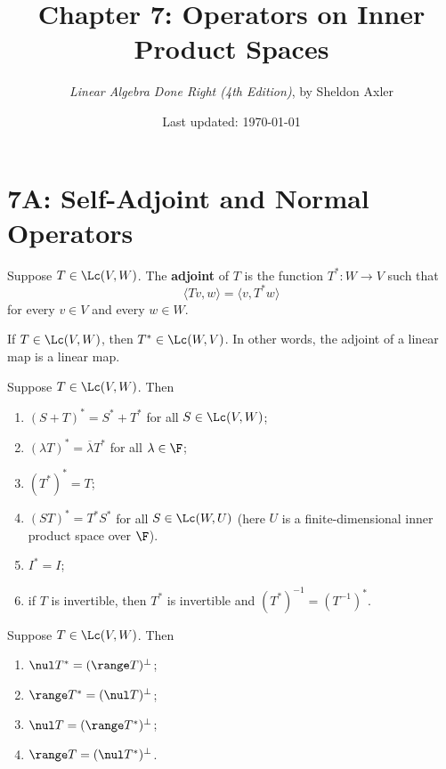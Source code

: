 \documentclass{extarticle}
\title{\vspace{-2em}Chapter 7: Operators on Inner Product Spaces}
\author{\emph{Linear Algebra Done Right (4th Edition)}, by Sheldon Axler}
\date{Last updated: \today}
\begin{document}
\maketitle
\tableofcontents
\newpage


\section*{7A: Self-Adjoint and Normal Operators}

\begin{definition}[adjoint, \(T^*\)]
    Suppose \( T \in \Lc(V, W)\). The \textbf{adjoint} of \(T\) is the function \(T^* \colon W \to V\) such
    that
    \[\langle Tv,w \rangle = \langle v,T^* w \rangle\]
    for every \(v \in V\) and every \(w \in W\).
\end{definition}

\begin{corollary}
    If \(T \in \Lc(V, W)\), then \(T^* \in \Lc(W, V)\). In other words, the adjoint of
    a linear map is a linear map.
\end{corollary}

\begin{corollary}
    Suppose \(T \in \Lc(V, W)\). Then
    \begin{enumerate}[label=(\alph*)]
        \item \((S + T)^* = S^* + T^*\) for all \(S \in \Lc(V, W)\);
        \item \((\lambda T)^* = \overline{\lambda} T^*\) for all \(\lambda \in \F\);
        \item \((T^*)^* = T\);
        \item \((ST)^* = T^* S^*\) for all \(S \in \Lc(W, U)\) (here \(U\) is a finite-dimensional
        inner product space over \(\F\)).
        \item \(I^* = I\);
        \item if \(T\) is invertible, then \(T^*\) is invertible and \((T^*)^{-1} = (T^{-1})^*\).
    \end{enumerate}
\end{corollary}

\begin{thm}
Suppose \(T \in \Lc(V, W)\). Then
\begin{enumerate}[label=(\alph*)]
    \item \(\nul T^* = (\range T)^\perp\);
    \item \(\range T^* = (\nul T)^\perp\);
    \item \(\nul T = (\range T^*)^\perp\);
    \item \(\range T = (\nul T^*)^\perp\).
\end{enumerate}
\end{thm}
\end{document}
